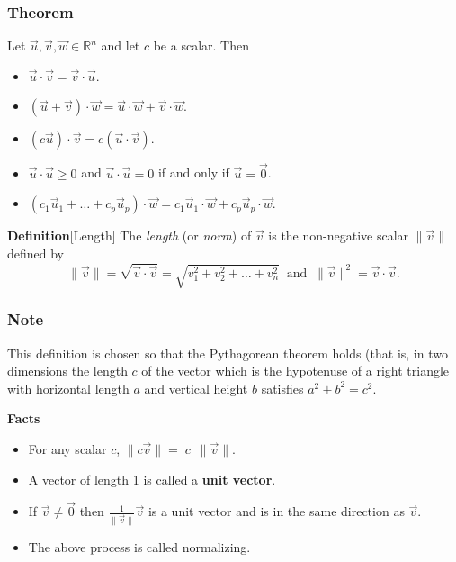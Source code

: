 \begin{frame}[fragile] \frametitle{Theorem}

Let $\vec{u}, \vec{v}, \vec{w} \in \mathbb R^n$ and let $c$  be a scalar.
Then 
\begin{itemize}
 \item $\vec{u}\cdot \vec{v} = \vec{v} \cdot \vec{u}$.
\item $(\vec{u} + \vec{v})\cdot \vec{w} = \vec{u}\cdot \vec{w}
+\vec{v}\cdot \vec{w}$.
\item $(c \vec{u})\cdot \vec{v}= c (\vec{u}\cdot \vec{v})$.
\item $\vec{u} \cdot \vec{u} \geq 0$ and $\vec{u}\cdot \vec{u} = 0$ 
if and only if $\vec{u} = \vec{0}$.
\item $(c_1 \vec{u}_1 +\dots + c_p \vec{u}_p)\cdot \vec{w} = c_1\vec{u}_1\cdot \vec{w}
+c_p\vec{u}_p\cdot \vec{w}$.
\end{itemize}
 

\textbf{Definition}[Length]
The {\em length} (or {\em norm})  of $\vec{v}$ is the non-negative scalar $\|\vec{v}\|$ 
defined by 
\[
 \| \vec{v} \| = \sqrt{\vec{v} \cdot \vec{v}} =
\sqrt{v_1^2 + v_2^2 +\dots + v_n^2} \ \text{ and } \ \|\vec{v} \|^2 = 
\vec{v}\cdot \vec{v}.
 \]

\end{frame}


\begin{frame}[fragile] \frametitle{Note}
 This definition is chosen so that the Pythagorean theorem holds (that is, in two 
dimensions the length $c$ of the vector which is the hypotenuse of a right triangle 
with horizontal length $a$ and vertical height $b$ satisfies $a^2 + b^2 = c^2$. 
 

\textbf{Facts}
\begin{itemize}
 \item For any scalar $c$, $\| c\vec{v}\| = |c| \ \|\vec{v}\|$.  
 \item A vector of length 1 is called a \textbf{unit vector}.  
 \item  If $\vec{v}\neq \vec{0}$ then $\frac{1}{\| \vec{v} \|} \vec{v}$ 
is a unit vector and is in the same direction as $\vec{v}$.   
 \item  The above process is called normalizing. 
\end{itemize}

\end{frame}



